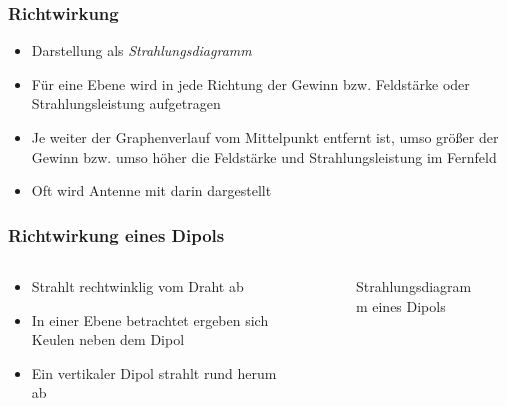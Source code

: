 \begin{frame}
\end{frame}

\begin{frame}
\frametitle{Richtwirkung}
\begin{itemize}
  \item Darstellung als \emph{Strahlungsdiagramm}
  \item Für eine Ebene wird in jede Richtung der Gewinn bzw. Feldstärke oder Strahlungsleistung aufgetragen
  \item Je weiter der Graphenverlauf vom Mittelpunkt entfernt ist, umso größer der Gewinn bzw. umso höher die Feldstärke und Strahlungsleistung im Fernfeld
  \item Oft wird Antenne mit darin dargestellt
  \end{itemize}
\end{frame}

\begin{frame}
\frametitle{Richtwirkung eines Dipols}
\begin{columns}
    \begin{column}{0.48\textwidth}
    \begin{itemize}
  \item Strahlt rechtwinklig vom Draht ab
  \item In einer Ebene betrachtet ergeben sich Keulen neben dem Dipol
  \item Ein vertikaler Dipol strahlt rund herum ab
  \end{itemize}

    \end{column}
   \begin{column}{0.48\textwidth}
       
\begin{figure}
    \caption{\scriptsize Strahlungsdiagramm eines Dipols}
    \label{e_antennenformen_strahlungsdiagramm_dipol}
\end{figure}


   \end{column}
\end{columns}

\end{frame}

